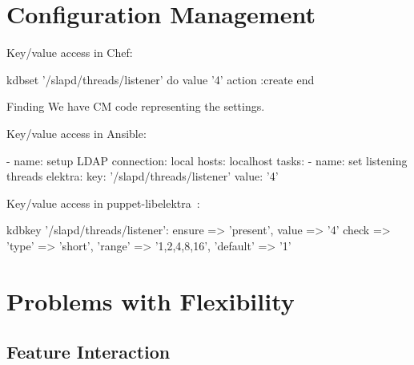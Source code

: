 \section{Configuration Management}

\begin{frame}[fragile]
	Key/value access in Chef:
	\vspace{0.5cm}

	\begin{code}[morekeywords={kdbset,do,action,value,end},gobble=4]
	kdbset '/slapd/threads/listener' do
		value '4'
		action :create
	end
	\end{code}

	\pause
	\begin{alertblock}{Finding}
	We have CM code representing the settings.
	\end{alertblock}
\end{frame}

\begin{frame}[fragile]
	Key/value access in Ansible:
	\vspace{0.5cm}

	\begin{code}[morekeywords={name,connection,key,value,elektra,mountpoint,file,plugins,hosts,tasks},gobble=4]
	- name: setup LDAP
	  connection: local
	  hosts: localhost
	  tasks:
	  - name: set listening threads
	    elektra:
	      key: '/slapd/threads/listener'
	      value: '4'
	\end{code}
\end{frame}

\begin{frame}[fragile]
	Key/value access in puppet-libelektra~\cite{raab2020unified}:
	\vspace{0.5cm}

	\begin{code}[morekeywords={kdbkey,kdbmount,ensure,value},gobble=4]
	kdbkey {'/slapd/threads/listener':
		ensure => 'present',
		value => '4'
		check => {
			'type' => 'short',
			'range' => '1,2,4,8,16',
			'default' => '1'
		}
	}
	\end{code}
\end{frame}


\section{Problems with Flexibility}

\subsection{Feature Interaction}

